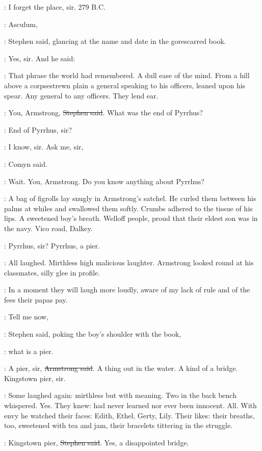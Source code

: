 \cochrane:
I forget the place, sir.
279 B.C.

\Stephen:
Asculum,

:
Stephen said, glancing at the name and date in the gorescarred book.

\cochrane:
Yes, sir.
And he said: 

\StephenInt:
That phrase the world had remembered.
A dull ease of the mind.
From a hill above a corpsestrewn plain
a general speaking to his officers, leaned upon his spear.
Any general to any officers.
They lend ear.

\Stephen:
You, Armstrong, \sout{Stephen said}.
What was the end of Pyrrhus?

\armstrong:
End of Pyrrhus, sir?

\comyn:
I know, sir.
Ask me, sir,

:
Comyn said.

\Stephen:
Wait.
You, Armstrong.
Do you know anything about Pyrrhus?

:
A bag of figrolls lay snugly in Armstrong's satchel.
He curled them between his palms at whiles and swallowed them softly.
Crumbs adhered to the tissue of his lips.
A sweetened boy's breath.
Welloff people, proud that their eldest son was in the navy.
Vico road, Dalkey.

\armstrong:
Pyrrhus, sir?
Pyrrhus, a pier.

:
All laughed.
Mirthless high malicious laughter.
Armstrong looked round at his classmates, silly glee in profile.

\StephenInt:
In a moment they will laugh more loudly,
aware of my lack of rule and of the fees their papas pay.

\Stephen:
Tell me now,

:
Stephen said, poking the boy's shoulder with the book,

\Stephen:
what is a pier.

\armstrong:
A pier, sir, \sout{Armstrong said}.
A thing out in the water.
A kind of a bridge.
Kingstown pier, sir.


:
Some laughed again: mirthless but with meaning.
Two in the back bench whispered.
Yes.
They knew: had never learned nor ever been innocent.
All.
With envy he watched their faces: Edith, Ethel, Gerty, Lily.
Their likes: their breaths, too,
sweetened with tea and jam,
their bracelets tittering in the struggle.

\Stephen:
Kingstown pier, \sout{Stephen said}.
Yes, a disappointed bridge.

